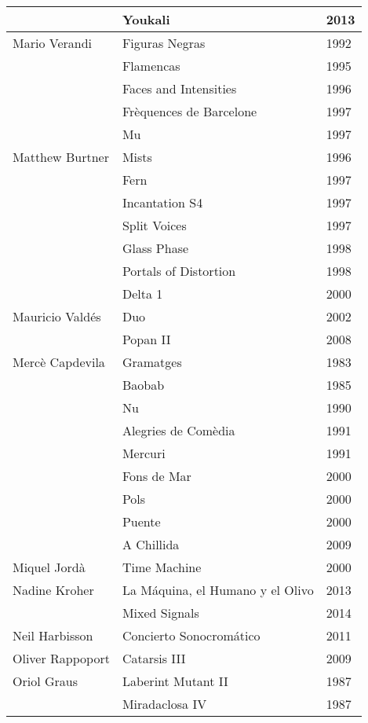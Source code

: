 \begin{center}
\begin{longtable}{ p{}  p{}  p{} }
& Youkali & 2013 \\ \midrule 
Mario Verandi & Figuras Negras & 1992 \\ \cmidrule (r){2-3} 
& Flamencas & 1995 \\ \cmidrule (r){2-3} 
& Faces and Intensities & 1996 \\ \cmidrule (r){2-3} 
& Frèquences de Barcelone & 1997 \\ \cmidrule (r){2-3} 
& Mu & 1997 \\ \midrule 
Matthew Burtner & Mists & 1996 \\ \cmidrule (r){2-3} 
& Fern & 1997 \\ \cmidrule (r){2-3} 
& Incantation S4 & 1997 \\ \cmidrule (r){2-3} 
& Split Voices & 1997 \\ \cmidrule (r){2-3} 
& Glass Phase & 1998 \\ \cmidrule (r){2-3} 
& Portals of Distortion & 1998 \\ \cmidrule (r){2-3} 
& Delta 1 & 2000 \\ \midrule 
Mauricio Valdés & Duo & 2002 \\ \cmidrule (r){2-3} 
& Popan II & 2008 \\ \midrule 
Mercè Capdevila & Gramatges & 1983 \\ \cmidrule (r){2-3} 
& Baobab & 1985 \\ \cmidrule (r){2-3} 
& Nu & 1990 \\ \cmidrule (r){2-3} 
& Alegries de Comèdia & 1991 \\ \cmidrule (r){2-3} 
& Mercuri & 1991 \\ \cmidrule (r){2-3} 
& Fons de Mar & 2000 \\ \cmidrule (r){2-3} 
& Pols & 2000 \\ \cmidrule (r){2-3} 
& Puente & 2000 \\ \cmidrule (r){2-3} 
& A Chillida & 2009 \\ \midrule 
Miquel Jordà & Time Machine & 2000 \\ \midrule 
Nadine Kroher & La Máquina, el Humano y el Olivo & 2013 \\ \cmidrule (r){2-3} 
& Mixed Signals & 2014 \\ \midrule 
Neil Harbisson & Concierto Sonocromático & 2011 \\ \midrule 
Oliver Rappoport & Catarsis III & 2009 \\ \midrule 
Oriol Graus & Laberint Mutant II & 1987 \\ \cmidrule (r){2-3} 
& Miradaclosa IV & 1987 \\ \cmidrule (r){2-3} 

\end{longtable}
\end{center}
